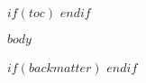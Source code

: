 \documentclass[$papertype$,twoside,showtrims,final,$fontsize$]{memoir}
\begin{document}
$if(toc)$
\clearpage
\thispagestyle{empty}
\tableofcontents*
\clearpage
$endif$


\cleartorecto
\mainmatter

\SingleSpacing




$body$




$if(backmatter)$
\cleartorecto
\backmatter
$endif$
\end{document}
